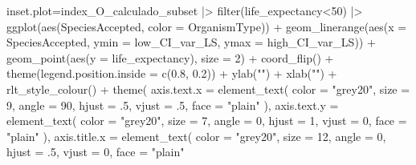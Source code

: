 \documentclass[
  12pt,
  letterpaper,
]{book}
\newenvironment{Shaded}{\begin{snugshade}}{\end{snugshade}}
\newcommand{\AttributeTok}[1]{\textcolor[rgb]{0.40,0.45,0.13}{#1}}
\newcommand{\DecValTok}[1]{\textcolor[rgb]{0.68,0.00,0.00}{#1}}
\newcommand{\FloatTok}[1]{\textcolor[rgb]{0.68,0.00,0.00}{#1}}
\newcommand{\FunctionTok}[1]{\textcolor[rgb]{0.28,0.35,0.67}{#1}}
\newcommand{\NormalTok}[1]{\textcolor[rgb]{0.00,0.23,0.31}{#1}}
\newcommand{\OtherTok}[1]{\textcolor[rgb]{0.00,0.23,0.31}{#1}}
\newcommand{\SpecialCharTok}[1]{\textcolor[rgb]{0.37,0.37,0.37}{#1}}
\newcommand{\StringTok}[1]{\textcolor[rgb]{0.13,0.47,0.30}{#1}}
\begin{document}
\begin{Shaded}
\begin{Highlighting}[]
\NormalTok{inset.plot}\OtherTok{=}\NormalTok{index\_O\_calculado\_subset }\SpecialCharTok{|\textgreater{}} 
  \FunctionTok{filter}\NormalTok{(life\_expectancy}\SpecialCharTok{\textless{}}\DecValTok{50}\NormalTok{) }\SpecialCharTok{|\textgreater{}} 
  \FunctionTok{ggplot}\NormalTok{(}\FunctionTok{aes}\NormalTok{(SpeciesAccepted, }\AttributeTok{color =}\NormalTok{ OrganismType)) }\SpecialCharTok{+}
  \FunctionTok{geom\_linerange}\NormalTok{(}\FunctionTok{aes}\NormalTok{(}\AttributeTok{x =}\NormalTok{ SpeciesAccepted, }\AttributeTok{ymin =}\NormalTok{ low\_CI\_var\_LS, }\AttributeTok{ymax =}\NormalTok{ high\_CI\_var\_LS)) }\SpecialCharTok{+}
  \FunctionTok{geom\_point}\NormalTok{(}\FunctionTok{aes}\NormalTok{(}\AttributeTok{y =}\NormalTok{ life\_expectancy), }\AttributeTok{size =} \DecValTok{2}\NormalTok{) }\SpecialCharTok{+}
  \FunctionTok{coord\_flip}\NormalTok{() }\SpecialCharTok{+}
  \FunctionTok{theme}\NormalTok{(}\AttributeTok{legend.position.inside =} \FunctionTok{c}\NormalTok{(}\FloatTok{0.8}\NormalTok{, }\FloatTok{0.2}\NormalTok{)) }\SpecialCharTok{+}
  \FunctionTok{ylab}\NormalTok{(}\StringTok{""}\NormalTok{) }\SpecialCharTok{+}
  \FunctionTok{xlab}\NormalTok{(}\StringTok{""}\NormalTok{) }\SpecialCharTok{+}
  \FunctionTok{rlt\_style\_colour}\NormalTok{() }\SpecialCharTok{+}
  \FunctionTok{theme}\NormalTok{(}
    \AttributeTok{axis.text.x =} \FunctionTok{element\_text}\NormalTok{(}
      \AttributeTok{color =} \StringTok{"grey20"}\NormalTok{,}
      \AttributeTok{size =} \DecValTok{9}\NormalTok{,}
      \AttributeTok{angle =} \DecValTok{90}\NormalTok{,}
      \AttributeTok{hjust =}\NormalTok{ .}\DecValTok{5}\NormalTok{,}
      \AttributeTok{vjust =}\NormalTok{ .}\DecValTok{5}\NormalTok{,}
      \AttributeTok{face =} \StringTok{"plain"}
\NormalTok{    ),}
    \AttributeTok{axis.text.y =} \FunctionTok{element\_text}\NormalTok{(}
      \AttributeTok{color =} \StringTok{"grey20"}\NormalTok{,}
      \AttributeTok{size =} \DecValTok{7}\NormalTok{,}
      \AttributeTok{angle =} \DecValTok{0}\NormalTok{,}
      \AttributeTok{hjust =} \DecValTok{1}\NormalTok{,}
      \AttributeTok{vjust =} \DecValTok{0}\NormalTok{,}
      \AttributeTok{face =} \StringTok{"plain"}
\NormalTok{    ),}
    \AttributeTok{axis.title.x =} \FunctionTok{element\_text}\NormalTok{(}
      \AttributeTok{color =} \StringTok{"grey20"}\NormalTok{,}
      \AttributeTok{size =} \DecValTok{12}\NormalTok{,}
      \AttributeTok{angle =} \DecValTok{0}\NormalTok{,}
      \AttributeTok{hjust =}\NormalTok{ .}\DecValTok{5}\NormalTok{,}
      \AttributeTok{vjust =} \DecValTok{0}\NormalTok{,}
      \AttributeTok{face =} \StringTok{"plain"}

\end{Highlighting}
\end{Shaded}
\end{document}

